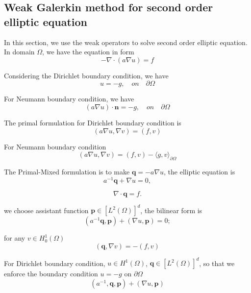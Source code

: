 \subsection{Weak Galerkin method for second order elliptic equation}
In this section, we use the weak operators to solve second order elliptic equation. In domain $ \Omega $, we have the equation in form
\begin{equation}
- \nabla \cdot (a \nabla u) = f
\end{equation}

Considering the Dirichlet boundary condition, we have
\begin{equation}
u = -g, \quad on \quad \partial \Omega
\end{equation}

For Neumann boundary condition, we have
\begin{equation}
(a \nabla u) \cdot \mathbf{n} = -g, \quad on \quad \partial \Omega
\end{equation}

The primal formulation for Dirichlet boundary condition is 
\begin{equation}
(a \nabla u, \nabla v) = (f, v)
\end{equation}

For Neumann boundary condition
\begin{equation}
(a \nabla u, \nabla v) = (f, v) - \langle g, v \rangle_{\partial \Omega}
\end{equation}

The Primal-Mixed formulation is to make $ \mathbf{q} = -a \nabla u $, the elliptic equation is 
\begin{equation}
a^{-1}\mathbf{q} + \nabla u = 0,
\end{equation}

\begin{equation}
\nabla \cdot \mathbf{q} = f.
\end{equation}

we choose assistant function $ \mathbf{p} \in [L^{2}(\Omega)]^{d} $, the bilinear form is
\begin{equation}
(a^{-1} \mathbf{q}, \mathbf{p}) + (\nabla u, \mathbf{p}) = 0;
\end{equation}

for any $ v \in H_{0}^{1} (\Omega) $
\begin{equation}
(\mathbf{q}, \nabla v) = -(f, v)
\end{equation}

For Dirichlet boundary condition, $ u \in H^{1}(\Omega) $, $ \mathbf{q} \in [L^{2} (\Omega)]^{d} $, so that we enforce the boundary condition $ u = -g  $ on $ \partial \Omega $
\begin{equation}
(a^{-1}, \mathbf{q}, \mathbf{p}) + (\nabla u, \mathbf{p})
\end{equation}

